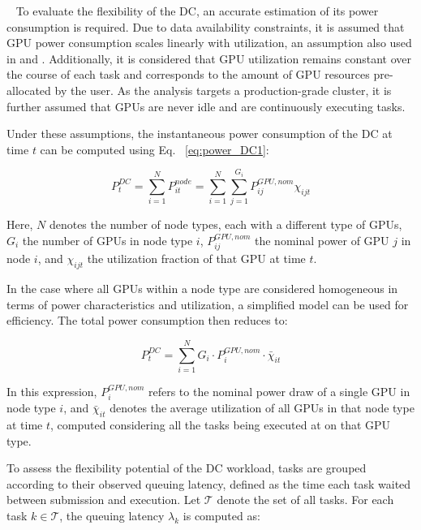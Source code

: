 \documentclass[preprint,12pt]{elsarticle}
\begin{document}
\
To evaluate the flexibility of the DC, an accurate estimation of its power consumption is required. Due to data availability constraints, it is assumed that GPU power consumption scales linearly with utilization, an assumption also used in \cite{Wang2024} and \cite{Shehabi2024}. Additionally, it is considered that GPU utilization remains constant over the course of each task and corresponds to the amount of GPU resources pre-allocated by the user. As the analysis targets a production-grade cluster, it is further assumed that GPUs are never idle and are continuously executing tasks.

Under these assumptions, the instantaneous power consumption of the DC at time $t$ can be computed using Eq. ~\ref{eq:power_DC1}:

\begin{equation} \label{eq:power_DC1}
P^{DC}_{t} = \sum_{i=1}^{N} P^{node}_{it} = \sum_{i=1}^{N} \sum_{j=1}^{G_i} P^{GPU, nom}_{ij} \chi_{ijt}
\end{equation}

Here, $N$ denotes the number of node types, each with a different type of GPUs, $G_i$ the number of GPUs in node type $i$, $P^{GPU, nom}_{ij}$ the nominal power of GPU $j$ in node $i$, and $\chi_{ijt}$ the utilization fraction of that GPU at time $t$. 

In the case where all GPUs within a node type are considered homogeneous in terms of power characteristics and utilization, a simplified model can be used for efficiency. The total power consumption then reduces to:

\begin{equation} \label{eq:power_DC2}
P^{DC}_t = \sum_{i=1}^{N} G_i \cdot P^{GPU, nom}_i \cdot \bar{\chi}_{it}
\end{equation}

In this expression, $P^{GPU, nom}_i$ refers to the nominal power draw of a single GPU in node type $i$, and $\bar{\chi}_{it}$ denotes the average utilization of all GPUs in that node type at time $t$, computed considering all the tasks being executed at on that GPU type.

To assess the flexibility potential of the DC workload, tasks are grouped according to their observed queuing latency, defined as the time each task waited between submission and execution. Let $\mathcal{T}$ denote the set of all tasks. For each task $k \in \mathcal{T}$, the queuing latency $\lambda_k$ is computed as:
\end{document}
